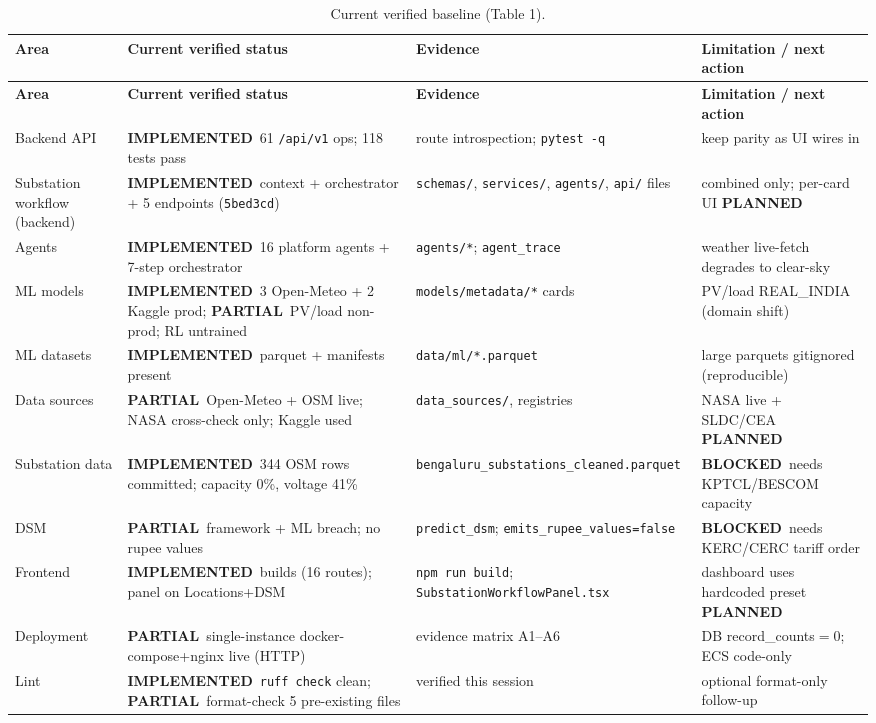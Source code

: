 \documentclass[11pt,a4paper]{article}
\newcommand{\stImpl}{\textcolor{cok}{\textbf{IMPLEMENTED}}}
\newcommand{\stP}{\textcolor{cpart}{\textbf{PARTIAL}}}
\newcommand{\stB}{\textcolor{cmiss}{\textbf{BLOCKED}}}
\newcommand{\stPlan}{\textcolor{cplan}{\textbf{PLANNED}}}
\newcommand{\code}[1]{\texttt{\small #1}}
\begin{document}
\begin{footnotesize}
\begin{longtable}{@{}p{2.4cm}p{4.4cm}p{4.0cm}p{3.5cm}@{}}
\caption{Current verified baseline (Table 1).}\label{tab:baseline}\\
\toprule
\textbf{Area} & \textbf{Current verified status} & \textbf{Evidence} & \textbf{Limitation / next action}\\
\midrule
\endfirsthead
\toprule
\textbf{Area} & \textbf{Current verified status} & \textbf{Evidence} & \textbf{Limitation / next action}\\
\midrule
\endhead
\bottomrule
\endfoot
Backend API & \stImpl\ 61 \code{/api/v1} ops; 118 tests pass & route introspection; \code{pytest -q} & keep parity as UI wires in\\
Substation workflow (backend) & \stImpl\ context + orchestrator + 5 endpoints (\code{5bed3cd}) & \code{schemas/}, \code{services/}, \code{agents/}, \code{api/} files & combined only; per-card UI \stPlan\\
Agents & \stImpl\ 16 platform agents + 7-step orchestrator & \code{agents/*}; \code{agent\_trace} & weather live-fetch degrades to clear-sky\\
ML models & \stImpl\ 3 Open-Meteo + 2 Kaggle prod; \stP\ PV/load non-prod; RL untrained & \code{models/metadata/*} cards & PV/load REAL\_INDIA (domain shift)\\
ML datasets & \stImpl\ parquet + manifests present & \code{data/ml/*.parquet} & large parquets gitignored (reproducible)\\
Data sources & \stP\ Open-Meteo + OSM live; NASA cross-check only; Kaggle used & \code{data\_sources/}, registries & NASA live + SLDC/CEA \stPlan\\
Substation data & \stImpl\ 344 OSM rows committed; capacity 0\%, voltage 41\% & \code{bengaluru\_substations\_cleaned.parquet} & \stB\ needs KPTCL/BESCOM capacity\\
DSM & \stP\ framework + ML breach; no rupee values & \code{predict\_dsm}; \code{emits\_rupee\_values=false} & \stB\ needs KERC/CERC tariff order\\
Frontend & \stImpl\ builds (16 routes); panel on Locations+DSM & \code{npm run build}; \code{SubstationWorkflowPanel.tsx} & dashboard uses hardcoded preset \stPlan\\
Deployment & \stP\ single-instance docker-compose+nginx live (HTTP) & evidence matrix A1--A6 & DB record\_counts$=0$; ECS code-only\\
Lint & \stImpl\ \code{ruff check} clean; \stP\ format-check 5 pre-existing files & verified this session & optional format-only follow-up\\
\end{longtable}
\end{footnotesize}
\end{document}
